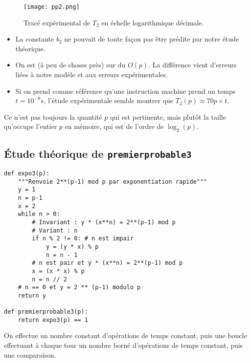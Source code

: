 \begin{figure}[!h]
  \begin{center}
    \texttt{[image: pp2.png]}
    \caption{Tracé expérimental de $T_2$ en échelle logarithmique décimale.}
    \label{fig.pp2}
  \end{center}
\end{figure}


\begin{itemize}
\item[\textbullet] La constante $b_{2}$ ne pouvait de toute façon pas être prédite
  par notre étude théorique.
\item[\textbullet] On est (à peu de choses près) sur du $O(p)$. La différence vient
  d'erreurs liées à notre modèle et aux erreurs expérimentales.
\item[\textbullet] Si on prend comme référence qu'une instruction machine prend
  un temps $t = 10^{-9}s$, l'étude expérimentale semble montrer que
  $T_{2}(p)\approx 70 p \times t$.
\end{itemize}

\begin{rem}
  Ce n'est pas toujours la quantité $p$ qui est pertinente, mais plutôt la taille qu'occupe l'entier $p$ en mémoire, qui est de l'ordre de $\log_2(p)$.
\end{rem}

\newpage

\subsection{Étude théorique de \texttt{premierprobable3}}

\begin{lstlisting}
def expo3(p):
    """Renvoie 2**(p-1) mod p par exponentiation rapide"""
    y = 1
    n = p-1
    x = 2
    while n > 0:
        # Invariant : y * (x**n) = 2**(p-1) mod p
        # Variant : n
        if n % 2 != 0: # n est impair
            y = (y * x) % p
            n = n - 1
        # n est pair et y * (x**n) = 2**(p-1) mod p
        x = (x * x) % p
        n = n // 2
    # n == 0 et y = 2 ** (p-1) modulo p
    return y

def premierprobable3(p):
    return expo3(p) == 1
\end{lstlisting}


On effectue un nombre constant d'opérations de temps constant, puis
une boucle  effectuant à chaque tour un nombre borné
d'opérations de temps constant, puis une comparaison.

